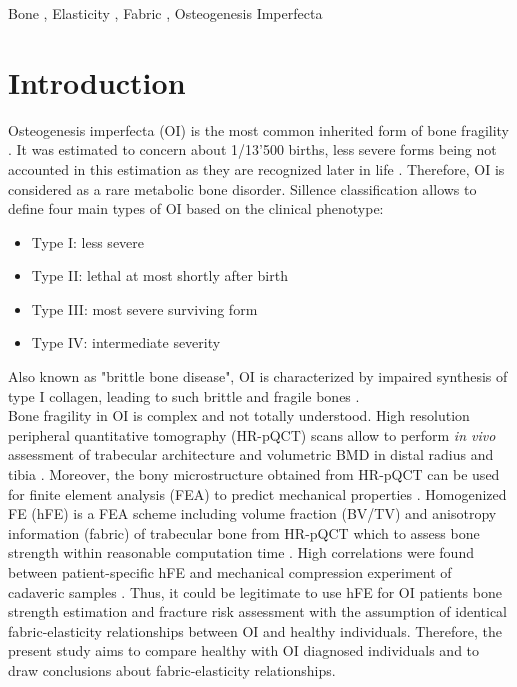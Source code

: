\documentclass[a4paper,fleqn]{DC_ArtStyle}
\begin{document}
\begin{keywords}
Bone \sep
Elasticity \sep
Fabric \sep
Osteogenesis Imperfecta
\end{keywords}


\maketitle

\section{Introduction}

Osteogenesis imperfecta (OI) is the most common inherited form of bone fragility \cite{Tournis2018}. It was estimated to concern about 1/13'500 births, less severe forms being not accounted in this estimation as they are recognized later in life \cite{Lindahl2015}. Therefore, OI is considered as a rare metabolic bone disorder. Sillence classification \cite{Sillence1979} allows to define four main types of OI based on the clinical phenotype:
\begin{itemize}
	\item Type I: less severe
	\item Type II: lethal at most shortly after birth
	\item Type III: most severe surviving form
	\item Type IV: intermediate severity
\end{itemize}
Also known as "brittle bone disease", OI is characterized by impaired synthesis of type I collagen, leading to such brittle and fragile bones \cite{LIM2017}.\\

Bone fragility in OI is complex and not totally understood. High resolution peripheral quantitative tomography (HR-pQCT) scans allow to perform \textit{in vivo} assessment of trabecular architecture and volumetric BMD in distal radius and tibia \cite{Boutroy2005}. Moreover, the bony microstructure obtained from HR-pQCT can be used for finite element analysis (FEA) to predict mechanical properties \cite{Boutroy2008}. Homogenized FE (hFE) is a FEA scheme including volume fraction (BV/TV) and anisotropy information (fabric) of trabecular bone from HR-pQCT which to assess bone strength within reasonable computation time \cite{Pahr2009}. High correlations were found between patient-specific hFE and mechanical compression experiment of cadaveric samples \cite{Varga2011,AriasMoreno2019}. Thus, it could be legitimate to use hFE for OI patients bone strength estimation and fracture risk assessment with the assumption of identical fabric-elasticity relationships between OI and healthy individuals. Therefore, the present study aims to compare healthy with OI diagnosed individuals and to draw conclusions about fabric-elasticity relationships.
\end{document}
